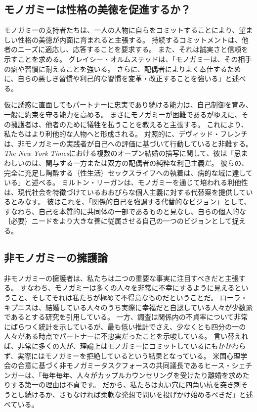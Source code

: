 \documentclass[paper=a4,book,openany]{jlreq}
\begin{document}
\subsection{モノガミーは性格の美徳を促進するか？}

モノガミーの支持者たちは、一人の人物に自らをコミットすることにより、望ましい性格の美徳が内面に育まれると主張する。
持続するコミットメントは、他者のニーズに適応し、応答することを要求する。
また、それは誠実さと信頼を示すことを求める。
グレイシー・オルムステッドは、「モノガミーは、その相手の癖や習慣に耐えることを強いる。
さらに、配偶者によりよく奉仕するために、自らの悪しき習慣や利己的な習慣を変革・改正することを強いる」と述べる\citep{olmstead14:_in_defen_monog_marriag}。

仮に誘惑に直面してもパートナーに忠実であり続ける能力は、自己制御を育み、一般に約束を守る能力を高める。
まさにモノガミーが困難であるがゆえに、その擁護者は、他者のために犠牲を払うことを教えると主張する。
これにより、私たちはより利他的な人物へと形成される。
対照的に、デヴィッド・フレンチは、非モノガミーの実践者が自己への評価に基づいて行動していると非難する。
\emph{The New York Times}における複数のオープン結婚の描写に関して、彼は「忌まわしいのは、関与する一方または双方の配偶者の純粋な利己主義だ。
彼らの、完全に充足し陶酔する｛性生活｝{セックスライフ}への執着は、病的な域に達している」と述べる\citep{french17:_this_is_how_elite_poison_our_cultur}。
ミルトン・リーガンは、モノガミーを通じて培われる利他性は、現代社会を特徴づけているおおぴらな個人主義に対する代替案を提供しているとみなす。
彼はこれを、「関係的自己を強調する代替的なビジョン」として、すなわち、自己を本質的に共同体の一部であるものと見なし、自らの個人的な｛必要｝{ニード}をより大きな善に従属させる自己の一つのビジョンとして捉える\citep[p.159]{regan96:_postm_famil_law}。

\subsection{非モノガミーの擁護論}

非モノガミーの擁護者は、私たちは二つの重要な事実に注目すべきだと主張する。
すなわち、モノガミーは多くの人々を非常に不幸にするように見えるということ、そしてそれは私たちが極めて不得意なものだということだ。
ローラ・キプニスは、結婚している人々のうち実際に幸福だと自認している人々が少数派であるとする研究を引用している\citep{kipnis03:_again_love}。
一方、調査は関係内の不貞率について非常にばらつく統計を示しているが、最も低い推計でさえ、少なくとも四分の一の人々がある時点でパートナーに不忠実だったことを示唆している\citep{blow05:_infid_commit_relat_ii,whisman07:_sexual_infid_nation_survey_americ_women}。
言い替えれば、非常に多くの人が、理論上はモノガミーにコミットしているにもかかわらず、実際にはモノガミーを拒絶しているという結果となっている。
米国心理学会の合意に基づく非モノガミータスクフォースの共同議長であるヒース・シェチンガーは、「毎年毎年、人々がカップルカウンセリングを受けたり離婚を求めたりする第一の理由は不貞です。
だから、私たちは丸い穴に四角い杭を突き刺そうとし続けるか、さもなければ柔軟な発想で問いを投げかけ始めるべきだ」と述べている\citep{hunt20:_psych_threes}。
\end{document}
